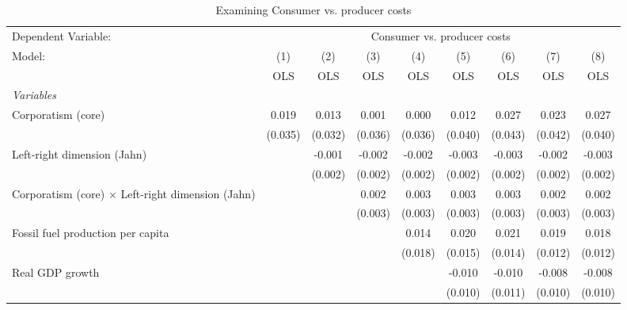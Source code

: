 
\begin{table}[htbp]
   \caption{Examining Consumer vs. producer costs}
   \centering
   \begin{tabular}{lcccccccc}
      \toprule
      Dependent Variable: & \multicolumn{8}{c}{Consumer vs. producer costs}\\
      Model:                                                   & (1)     & (2)     & (3)     & (4)     & (5)     & (6)     & (7)     & (8)\\  
                                                               &  OLS    & OLS     & OLS     & OLS     & OLS     & OLS     & OLS     & OLS\\  
      \midrule
      \emph{Variables}\\
      Corporatism (core)                                       & 0.019   & 0.013   & 0.001   & 0.000   & 0.012   & 0.027   & 0.023   & 0.027\\   
                                                               & (0.035) & (0.032) & (0.036) & (0.036) & (0.040) & (0.043) & (0.042) & (0.040)\\   
      Left-right dimension (Jahn)                              &         & -0.001  & -0.002  & -0.002  & -0.003  & -0.003  & -0.002  & -0.003\\   
                                                               &         & (0.002) & (0.002) & (0.002) & (0.002) & (0.002) & (0.002) & (0.002)\\   
      Corporatism (core) $\times$ Left-right dimension (Jahn)  &         &         & 0.002   & 0.003   & 0.003   & 0.003   & 0.002   & 0.002\\   
                                                               &         &         & (0.003) & (0.003) & (0.003) & (0.003) & (0.003) & (0.003)\\   
      Fossil fuel production per capita                        &         &         &         & 0.014   & 0.020   & 0.021   & 0.019   & 0.018\\   
                                                               &         &         &         & (0.018) & (0.015) & (0.014) & (0.012) & (0.012)\\   
      Real GDP growth                                          &         &         &         &         & -0.010  & -0.010  & -0.008  & -0.008\\   
                                                               &         &         &         &         & (0.010) & (0.011) & (0.010) & (0.010)\\   

\end{tabular}
\end{table}
